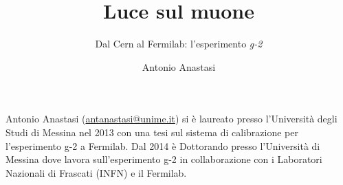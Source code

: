 ﻿\title{Luce sul muone}
\subtitle{Dal Cern al Fermilab: l'esperimento \emph{g-2}}
\suptitle{\phantom{x}}
\author{Antonio Anastasi}
\maketitle
\begin{small}
\pichskip{4mm}
\nobalance



\vfill
\begin{thebiography}{}%
Antonio Anastasi (\url{antanastasi@unime.it}) si è
laureato presso l'Università degli Studi di Messina nel 2013 con una tesi
sul sistema di calibrazione per l'esperimento g-2 a Fermilab. Dal 2014 è
Dottorando presso l'Università di Messina dove lavora sull'esperimento g-2
in collaborazione con i Laboratori Nazionali di Frascati (INFN) e il
Fermilab.
\end{thebiography}
\end{small}

